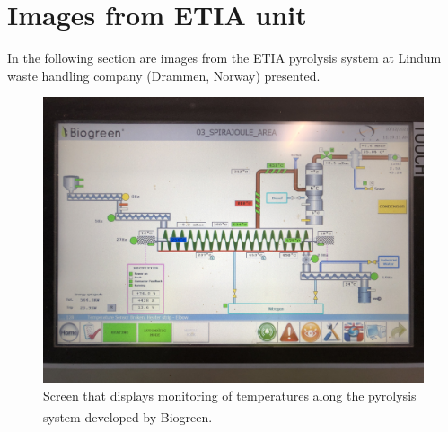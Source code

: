 \chapter{Images from ETIA unit}\label{appSec:ETIA} 

In the following section are images from the ETIA pyrolysis system at Lindum waste handling company (Drammen, Norway) presented. 


\begin{figure}
    \centering
    \includegraphics[width=0.7\linewidth,scale=0.7]{Bilder/Pyrolysis/Screen.png}
    \caption{Screen that displays monitoring of temperatures along the pyrolysis system developed by Biogreen\textsuperscript{\textregistered}.}
    \label{appFig:screen}
\end{figure}